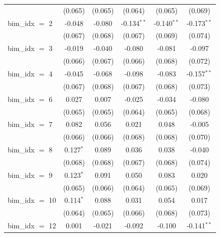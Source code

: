 \begin{tabular}{lccccc}
                       & (0.065)        & (0.065)        & (0.064)        & (0.065)        & (0.069)\\   
   bim\_idx $=$ 2      & -0.048         & -0.080         & -0.134$^{**}$  & -0.140$^{**}$  & -0.173$^{**}$\\   
                       & (0.067)        & (0.068)        & (0.067)        & (0.069)        & (0.074)\\   
   bim\_idx $=$ 3      & -0.019         & -0.040         & -0.080         & -0.081         & -0.097\\   
                       & (0.066)        & (0.067)        & (0.066)        & (0.068)        & (0.072)\\   
   bim\_idx $=$ 4      & -0.045         & -0.068         & -0.098         & -0.083         & -0.157$^{**}$\\   
                       & (0.067)        & (0.068)        & (0.067)        & (0.068)        & (0.073)\\   
   bim\_idx $=$ 6      & 0.027          & 0.007          & -0.025         & -0.034         & -0.080\\   
                       & (0.065)        & (0.065)        & (0.064)        & (0.065)        & (0.068)\\   
   bim\_idx $=$ 7      & 0.082          & 0.056          & 0.021          & 0.048          & -0.005\\   
                       & (0.066)        & (0.066)        & (0.068)        & (0.068)        & (0.070)\\   
   bim\_idx $=$ 8      & 0.127$^{*}$    & 0.089          & 0.036          & 0.038          & -0.040\\   
                       & (0.068)        & (0.068)        & (0.067)        & (0.068)        & (0.074)\\   
   bim\_idx $=$ 9      & 0.123$^{*}$    & 0.091          & 0.050          & 0.083          & 0.020\\   
                       & (0.065)        & (0.066)        & (0.064)        & (0.065)        & (0.069)\\   
   bim\_idx $=$ 10     & 0.114$^{*}$    & 0.088          & 0.031          & 0.054          & 0.017\\   
                       & (0.064)        & (0.065)        & (0.066)        & (0.068)        & (0.073)\\   
   bim\_idx $=$ 12     & 0.001          & -0.021         & -0.092         & -0.100         & -0.141$^{**}$\\   

\end{tabular}
